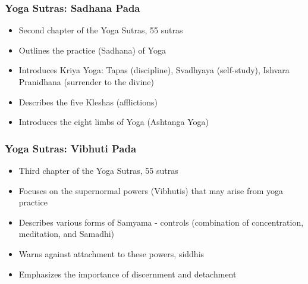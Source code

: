 \begin{frame}[fragile]\frametitle{Yoga Sutras: Sadhana Pada}
    \begin{itemize}
        \item Second chapter of the Yoga Sutras, 55 sutras
        \item Outlines the practice (Sadhana) of Yoga
        \item Introduces Kriya Yoga: Tapas (discipline), Svadhyaya (self-study), Ishvara Pranidhana (surrender to the divine)
        \item Describes the five Kleshas (afflictions)
        \item Introduces the eight limbs of Yoga (Ashtanga Yoga)
    \end{itemize}
\end{frame}

\begin{frame}[fragile]\frametitle{Yoga Sutras: Vibhuti Pada}
    \begin{itemize}
        \item Third chapter of the Yoga Sutras, 55 sutras
        \item Focuses on the supernormal powers (Vibhutis) that may arise from yoga practice
        \item Describes various forms of Samyama - controls (combination of concentration, meditation, and Samadhi)
        \item Warns against attachment to these powers, siddhis
        \item Emphasizes the importance of discernment and detachment
    \end{itemize}
\end{frame}

